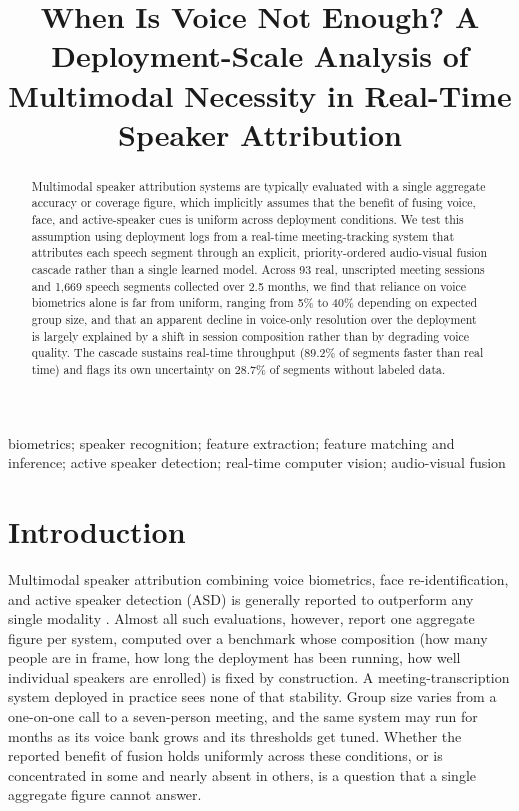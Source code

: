 \documentclass[conference,a4paper]{IEEEtran}
\title{When Is Voice Not Enough? A Deployment-Scale Analysis of\\
Multimodal Necessity in Real-Time Speaker Attribution}
\author{
\IEEEauthorblockN{Anonymous Author(s)}
\IEEEauthorblockA{Affiliation withheld for double-blind review}
}
\begin{document}
\maketitle

\begin{abstract}
Multimodal speaker attribution systems are typically evaluated with a
single aggregate accuracy or coverage figure, which implicitly assumes
that the benefit of fusing voice, face, and active-speaker cues is
uniform across deployment conditions. We test this assumption using
deployment logs from a real-time meeting-tracking system that
attributes each speech segment through an explicit, priority-ordered
audio-visual fusion cascade rather than a single learned model. Across
93 real, unscripted meeting sessions and 1,669 speech segments
collected over 2.5 months, we find that reliance on voice biometrics
alone is far from uniform, ranging from 5\% to 40\% depending on
expected group size, and that an apparent decline in voice-only
resolution over the deployment is largely explained by a shift in
session composition rather than by degrading voice quality. The
cascade sustains real-time throughput (89.2\% of segments faster than
real time) and flags its own uncertainty on 28.7\% of segments without
labeled data.
\end{abstract}

\begin{IEEEkeywords}
biometrics; speaker recognition; feature extraction; feature matching and inference; active speaker detection; real-time computer vision; audio-visual fusion
\end{IEEEkeywords}

\section{Introduction}

Multimodal speaker attribution combining voice biometrics, face
re-identification, and active speaker detection (ASD) is generally
reported to outperform any single modality
\cite{chung2017lipsync,tao2021talknet,liao2023lightasd}. Almost all
such evaluations, however, report one aggregate figure per system,
computed over a benchmark whose composition (how many people are in
frame, how long the deployment has been running, how well individual
speakers are enrolled) is fixed by construction. A meeting-transcription
system deployed in practice sees none of that stability. Group size
varies from a one-on-one call to a seven-person meeting, and the same
system may run for months as its voice bank grows and its thresholds
get tuned. Whether the reported benefit of fusion holds uniformly
across these conditions, or is concentrated in some and nearly absent
in others, is a question that a single aggregate figure cannot answer.
\end{document}
